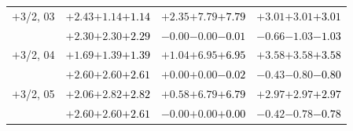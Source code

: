 \documentclass[compress]{beamer}
\begin{document}
\begin{frame}
\begin{tabular}{r | c | c | c}
$+$3/2, 03 & $+2.43$\hspace{0.1 cm}$+1.14$\hspace{0.1 cm}\textcolor{black}{$+1.14$} & $+2.35$\hspace{0.1 cm}$+7.79$\hspace{0.1 cm}\textcolor{black}{$+7.79$} & $+3.01$\hspace{0.1 cm}$+3.01$\hspace{0.1 cm}\textcolor{black}{$+3.01$} \\
           & $+2.30$\hspace{0.1 cm}$+2.30$\hspace{0.1 cm}\textcolor{black}{$+2.29$} & $-0.00$\hspace{0.1 cm}$-0.00$\hspace{0.1 cm}\textcolor{black}{$-0.01$} & $-0.66$\hspace{0.1 cm}$-1.03$\hspace{0.1 cm}\textcolor{black}{$-1.03$} \\
$+$3/2, 04 & $+1.69$\hspace{0.1 cm}$+1.39$\hspace{0.1 cm}\textcolor{black}{$+1.39$} & $+1.04$\hspace{0.1 cm}$+6.95$\hspace{0.1 cm}\textcolor{black}{$+6.95$} & $+3.58$\hspace{0.1 cm}$+3.58$\hspace{0.1 cm}\textcolor{black}{$+3.58$} \\
           & $+2.60$\hspace{0.1 cm}$+2.60$\hspace{0.1 cm}\textcolor{black}{$+2.61$} & $+0.00$\hspace{0.1 cm}$+0.00$\hspace{0.1 cm}\textcolor{black}{$-0.02$} & $-0.43$\hspace{0.1 cm}$-0.80$\hspace{0.1 cm}\textcolor{black}{$-0.80$} \\
$+$3/2, 05 & $+2.06$\hspace{0.1 cm}$+2.82$\hspace{0.1 cm}\textcolor{black}{$+2.82$} & $+0.58$\hspace{0.1 cm}$+6.79$\hspace{0.1 cm}\textcolor{black}{$+6.79$} & $+2.97$\hspace{0.1 cm}$+2.97$\hspace{0.1 cm}\textcolor{black}{$+2.97$} \\
           & $+2.60$\hspace{0.1 cm}$+2.60$\hspace{0.1 cm}\textcolor{black}{$+2.61$} & $-0.00$\hspace{0.1 cm}$+0.00$\hspace{0.1 cm}\textcolor{black}{$+0.00$} & $-0.42$\hspace{0.1 cm}$-0.78$\hspace{0.1 cm}\textcolor{black}{$-0.78$} \\

\end{tabular}
\end{frame}
\end{document}
